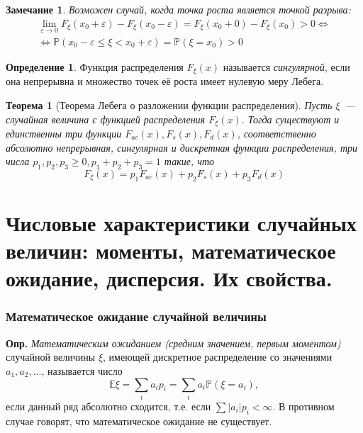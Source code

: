 \documentclass[oneside,final,14pt]{extreport}
\newcommand\mydef{{\bf Опр.}}
\newtheorem{thm}{Теорема}[section]
\newtheorem*{rmrk}{Замечание}
\theoremstyle{definition}
\newtheorem{defn}{Определение}[section]
\begin{document}
\begin{rmrk}
    Возможен случай, когда точка роста является точкой разрыва:
    \begin{multline*}
    \lim _{\varepsilon \to 0} F_{\xi}\left(x_{0}+\varepsilon\right)-F_{\xi}\left(x_{0}-\varepsilon\right)=F_{\xi}\left(x_{0}+0\right)-F_{\xi}\left(x_{0}\right)>0 \Leftrightarrow \\
    \Leftrightarrow \mathbb{P}\left(x_{0}-\varepsilon \leqslant \xi<x_{0}+\varepsilon\right)=\mathbb{P}\left(\xi=x_{0}\right)>0
    \end{multline*}
\end{rmrk}

\begin{defn}
    Функция распределения $F_\xi(x)$ называется {\it сингулярной}, если она непрерывна и множество точек её роста имеет нулевую меру Лебега.
\end{defn}

\begin{thm}[Теорема Лебега о разложении функции распределения]
    Пусть $\xi$~--- случайная величина с функцией распределения $F_\xi(x).$ Тогда существуют и единственны три функции $F_{ac}(x), F_s(x), F_d(x)$, соответственно абсолютно непрерывная, сингулярная и дискретная функции распределения, три числа $p_1, p_2, p_3 \geq 0, p_1 + p_2 + p_3 = 1$ такие, что 
    \begin{equation*}
        F_{\xi}(x)=p_{1} F_{ac}(x)+p_{2} F_{s}(x)+p_{3} F_{d}(x)
    \end{equation*}
\end{thm}

\section{Числовые характеристики случайных величин: моменты, математическое ожидание, дисперсия. Их свойства.}

\subsubsection{Математическое ожидание случайной величины}

\mydef{} {\it Математическим ожиданием (средним значением, первым моментом)} случайной величины $\xi$, имеющей дискретное распределение со значениями $a_1, a_2, ...$, называется число
$$\mathbb{E} \xi=\sum_{i} a_{i} p_{i}=\sum_{i} a_{i} \mathbb{P}\left(\xi=a_{i}\right),$$
если данный ряд абсолютно сходится, т.е. если $\sum |a_i|p_i < \infty.$ В противном случае говорят, что математическое ожидание не существует.
\end{document}
